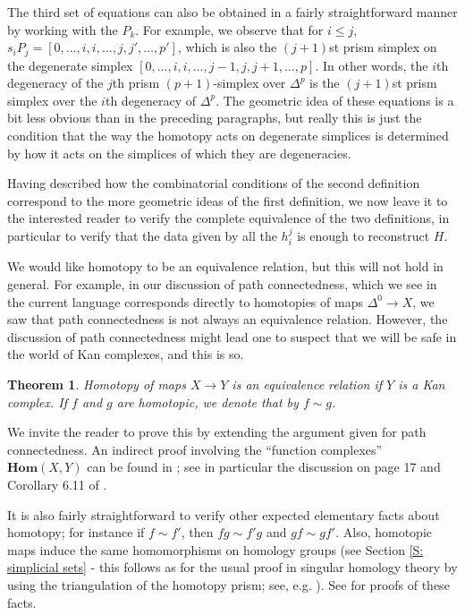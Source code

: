 \documentclass[12pt]{article}
\theoremstyle{plain}
\newtheorem{theorem}{Theorem}[section]
\theoremstyle{definition}
\newcommand{\Homs}{\textbf{Hom}}
\begin{document}
The third set of equations can also be obtained in a fairly straightforward manner by working with the $P_k$. For example, we observe that for $i\leq j$, $s_iP_j=[0,\ldots,i,i,\ldots,j,j',\ldots,p']$, which is also the $(j+1)$st prism simplex on the degenerate simplex $[0,\ldots,i,i,\ldots,j-1,j,j+1,\ldots,p]$. In other words, the $i$th degeneracy of the $j$th prism $(p+1)$-simplex over $\Delta^p$ is the $(j+1)$st prism simplex over the $i$th degeneracy of $\Delta^p$. 
The geometric idea of these equations is a bit less obvious than in the preceding paragraphs, but really this is just the condition that the way the homotopy acts on degenerate simplices is determined by how it acts on the simplices of which they are degeneracies. 

Having described how the combinatorial conditions of the second definition correspond to the more geometric ideas of the first definition, we now leave it to the interested reader to verify the complete equivalence of the two definitions, in particular to verify that the data given by all the $h_i^j$ is enough to reconstruct $H$.

\smallskip

We would like  homotopy to be an equivalence relation, but this will not hold in general. For example, in our discussion of path connectedness, which we see in the current language corresponds directly to homotopies of maps $\Delta^0\to X$, we saw that path connectedness is not always an equivalence relation. However, the discussion of path connectedness might lead one to suspect that we will be safe in the world of Kan complexes, and this is so.

\begin{theorem}
Homotopy of maps $X\to Y$ is an equivalence relation if $Y$ is a Kan complex. If $f$ and $g$ are homotopic, we denote that by $f\sim g$. 
\end{theorem}

We invite the reader to prove this by extending the argument given for path connectedness. An indirect proof involving the  ``function complexes'' $\Homs(X,Y)$ can be found in \cite{MAY67}; see in particular the discussion on page 17 and Corollary 6.11 of \cite{MAY67}. 

It is also fairly straightforward to verify other expected elementary facts about homotopy; for instance if $f\sim f'$, then $fg\sim f'g$ and $gf\sim gf'$. Also, homotopic maps induce the same homomorphisms on homology groups (see Section \ref{S: simplicial sets} - this follows as for the usual proof in singular homology theory by using the triangulation of the homotopy prism; see, e.g. \cite{MK}). See \cite[Section I.5]{MAY67} for proofs of these facts. 
\end{document}
